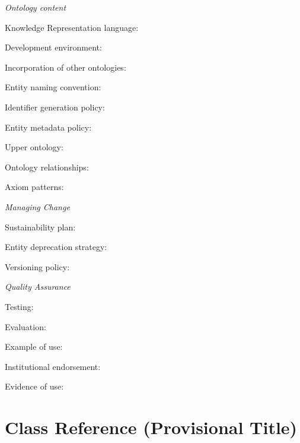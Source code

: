 \documentclass[english]{article}
\begin{document}
\begin{labelist}
\begin{labelist}
        \end{labelist}
    \item 
        \textit{Ontology content}
        \begin{labelist}
            \item Knowledge Representation language:
            \item Development environment:
            \item Incorporation of other ontologies:
            \item Entity naming convention:
            \item Identifier generation policy:
            \item Entity metadata policy:
            \item Upper ontology:
            \item Ontology relationships:
            \item Axiom patterns:
        \end{labelist}
    \item 
        \textit{Managing Change}
        \begin{labelist}
            \item Sustainability plan:
            \item Entity deprecation strategy:
            \item Versioning policy:
        \end{labelist}
    \item 
        \textit{Quality Assurance}
        \begin{labelist}
            \item Testing:
            \item Evaluation:
            \item Example of use:
            \item Institutional endorsement:
            \item Evidence of use:
        \end{labelist}
\end{labelist}


\section{Class Reference (Provisional Title)}
\end{document}
